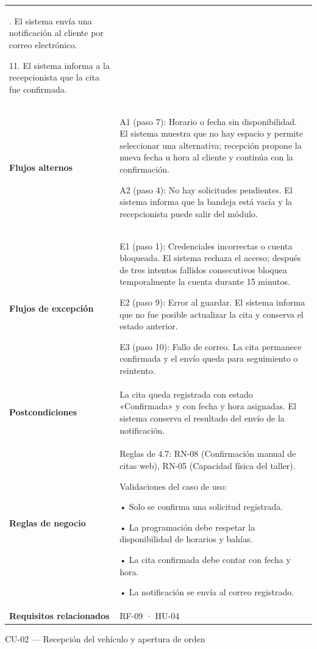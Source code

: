 {\begin{longtable}[]{@{}
  >{\raggedright\arraybackslash}p{}
  >{\raggedright\arraybackslash}p{}@{}}
10. El sistema envía una notificación al cliente por correo electrónico.

11. El sistema informa a la recepcionista que la cita fue confirmada. \\
\textbf{Flujos alternos} & A1 (paso 7): Horario o fecha sin
disponibilidad. El sistema muestra que no hay espacio y permite
seleccionar una alternativa; recepción propone la nueva fecha u hora al
cliente y continúa con la confirmación.

A2 (paso 4): No hay solicitudes pendientes. El sistema informa que la
bandeja está vacía y la recepcionista puede salir del módulo. \\
\textbf{Flujos de excepción} & E1 (paso 1): Credenciales incorrectas o
cuenta bloqueada. El sistema rechaza el acceso; después de tres intentos
fallidos consecutivos bloquea temporalmente la cuenta durante 15
minutos.

E2 (paso 9): Error al guardar. El sistema informa que no fue posible
actualizar la cita y conserva el estado anterior.

E3 (paso 10): Fallo de correo. La cita permanece confirmada y el envío
queda para seguimiento o reintento. \\
\textbf{Postcondiciones} & La cita queda registrada con estado
«Confirmada» y con fecha y hora asignadas. El sistema conserva el
resultado del envío de la notificación. \\
\textbf{Reglas de negocio} & Reglas de 4.7: RN-08 (Confirmación manual
de citas web), RN-05 (Capacidad física del taller).

Validaciones del caso de uso:

• Solo se confirma una solicitud registrada.

• La programación debe respetar la disponibilidad de horarios y bahías.

• La cita confirmada debe contar con fecha y hora.

• La notificación se envía al correo registrado. \\
\textbf{Requisitos relacionados} & RF-09 · HU-04 \\
\end{longtable}
}

CU-02 --- Recepción del vehículo y apertura de orden

